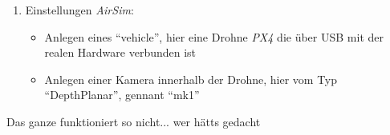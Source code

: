 \begin{enumerate}
\begin{itemize}
    \end{itemize}
    \item Einstellungen \textit{AirSim}:
    \begin{itemize}
        \item Anlegen eines \enquote{vehicle}, hier eine Drohne \textit{PX4} die über USB mit der realen Hardware verbunden ist
        \item Anlegen einer Kamera innerhalb der Drohne, hier vom Typ \enquote{DepthPlanar}, gennant \enquote{mk1}
    \end{itemize}
\end{enumerate}

Das ganze funktioniert so nicht... wer hätts gedacht

\clearpage